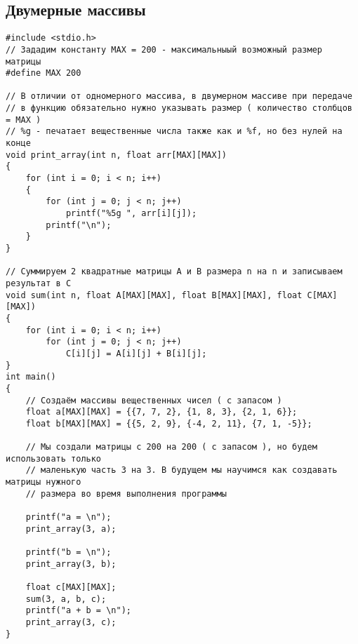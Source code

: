 \documentclass{article}
\begin{document}
\subsection{Двумерные массивы}

\begin{lstlisting}
#include <stdio.h>
// Зададим константу MAX = 200 - максимальныый возможный размер матрицы
#define MAX 200

// В отличии от одномерного массива, в двумерном массиве при передаче
// в функцию обязательно нужно указывать размер ( количество столбцов = MAX )
// %g - печатает вещественные числа также как и %f, но без нулей на конце
void print_array(int n, float arr[MAX][MAX]) 
{
    for (int i = 0; i < n; i++) 
    {
        for (int j = 0; j < n; j++)
            printf("%5g ", arr[i][j]);
        printf("\n");
    }
}

// Суммируем 2 квадратные матрицы A и B размера n на n и записываем результат в C
void sum(int n, float A[MAX][MAX], float B[MAX][MAX], float C[MAX][MAX])
{
    for (int i = 0; i < n; i++) 
        for (int j = 0; j < n; j++)
            C[i][j] = A[i][j] + B[i][j];
}
int main() 
{
    // Создаём массивы вещественных чисел ( с запасом )
    float a[MAX][MAX] = {{7, 7, 2}, {1, 8, 3}, {2, 1, 6}};
    float b[MAX][MAX] = {{5, 2, 9}, {-4, 2, 11}, {7, 1, -5}};
    
    // Мы создали матрицы с 200 на 200 ( c запасом ), но будем использовать только 
    // маленькую часть 3 на 3. В будущем мы научимся как создавать матрицы нужного
    // размера во время выполнения программы 
    
    printf("a = \n");
    print_array(3, a);
    
    printf("b = \n");
    print_array(3, b);
    
    float c[MAX][MAX];
    sum(3, a, b, c);    
    printf("a + b = \n");
    print_array(3, c);
}

\end{lstlisting}
\newpage
\end{document}
